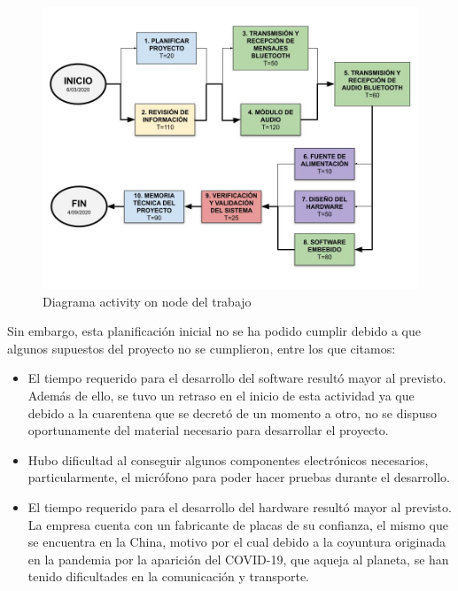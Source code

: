 \begin{figure}[htpb]
	\centering
	\includegraphics[scale=0.4]{./Figures/ActivityOnNode.jpg}
	\caption{Diagrama activity on node del trabajo}
	\label{fig:ActivityOnNode}
\end{figure}

Sin embargo, esta planificación inicial no se ha podido cumplir debido a que algunos supuestos del proyecto no se cumplieron, entre los que citamos:

\begin{itemize}

\item El tiempo requerido para el desarrollo del software resultó mayor al previsto. Además de ello, se tuvo un retraso en el inicio de esta actividad ya que debido a la cuarentena que se decretó de un momento a otro, no se dispuso oportunamente del material necesario para desarrollar el proyecto.

\item Hubo dificultad al conseguir algunos componentes electrónicos necesarios, particularmente, el micrófono para poder hacer pruebas durante el desarrollo.

\item El tiempo requerido para el desarrollo del hardware resultó mayor al previsto. La empresa cuenta con un fabricante de placas de su confianza, el mismo que se encuentra en la China, motivo por el cual debido a la coyuntura originada en la pandemia por la aparición del COVID-19, que aqueja al planeta, se han tenido dificultades en la comunicación y transporte.

\end{itemize}